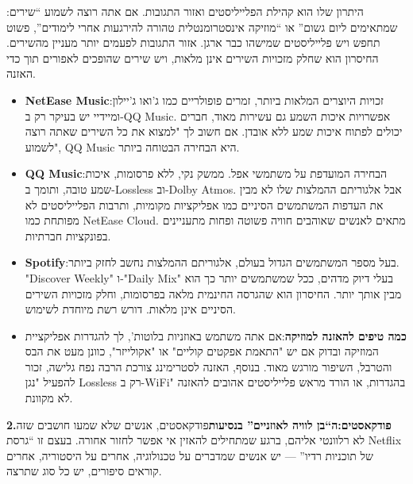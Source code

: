 


:היתרון שלו הוא קהילת הפלייליסטים ואזור התגובות. אם אתה רוצה לשמוע “שירים שמתאימים ליום גשום” או “מוזיקה אינסטרומנטלית טהורה להירגעות אחרי לימודים”, פשוט תחפש ויש פלייליסטים שמישהו כבר ארגן. אזור התגובות לפעמים יותר מעניין מהשירים. החיסרון הוא שחלק מזכויות השירים אינן מלאות, ויש שירים שהופכים לאפורים תוך כדי האזנה.

\begin{itemize}
  \item \textbf{NetEase Music}:זכויות היוצרים המלאות ביותר, זמרים פופולריים כמו ג'ואו ג'יילון ומיידיי יש בעיקר רק ב-QQ Music. אפשרויות איכות השמע גם עשירות מאוד, חברים יכולים לפתוח איכות שמע ללא אובדן. אם חשוב לך "למצוא את כל השירים שאתה רוצה לשמוע", QQ Music היא הבחירה הבטוחה ביותר.
  \item \textbf{QQ Music}:הבחירה המועדפת על משתמשי אפל. ממשק נקי, ללא פרסומות, איכות שמע טובה, ותומך ב-Lossless וב-Dolby Atmos. אבל אלגוריתם ההמלצות שלו לא מבין את העדפות המשתמשים הסיניים כמו אפליקציות מקומיות, ותרבות הפלייליסטים לא מפותחת כמו NetEase Cloud. מתאים לאנשים שאוהבים חוויה פשוטה ופחות מתעניינים בפונקציות חברתיות.
  \item \textbf{Spotify}:בעל מספר המשתמשים הגדול בעולם, אלגוריתם ההמלצות נחשב לחזק ביותר. "Discover Weekly" ו-"Daily Mix" בעלי דיוק מדהים, ככל שמשתמשים יותר כך הוא מבין אותך יותר. החיסרון הוא שהגרסה החינמית מלאה בפרסומות, וחלק מזכויות השירים הסיניים אינן מלאות. דורש רשת מיוחדת לשימוש.
  \item \textbf{כמה טיפים להאזנה למוזיקה}:אם אתה משתמש באוזניות בלוטות', לך להגדרות אפליקציית המוזיקה ובדוק אם יש "התאמת אפקטים קוליים" או "אקולייזר", כוונן מעט את הבס והטרבל, השיפור מורגש מאוד. בנוסף, האזנה לסטרימינג צורכת הרבה נפח גלישה, זכור להפעיל "נגן Lossless רק ב-WiFi" בהגדרות, או הורד מראש פלייליסטים אהובים להאזנה לא מקוונת.
\end{itemize}

\textbf{2.פודקאסטים:ה“בן לוויה לאוזניים” בנסיעות}פודקאסטים, אנשים שלא שמעו חושבים שזה לא רלוונטי אליהם, ברגע שמתחילים להאזין אי אפשר לחזור אחורה. בעצם זו “גרסת Netflix של תוכניות רדיו” — יש אנשים שמדברים על טכנולוגיה, אחרים על היסטוריה, אחרים קוראים סיפורים, יש כל סוג שתרצה.


